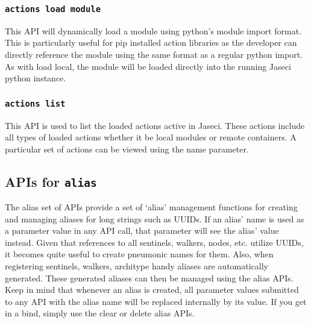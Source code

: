 \subsubsection{\lstinline[basicstyle=\Large\ttfamily]$actions load module$}

{This API will dynamically load a module using python's module import format.
This is particularly useful for pip installed action libraries as the developer
can directly reference the module using the same format as a regular python
import. As with load local, the module will be loaded directly into the running
Jaseci python instance.\vspace{4mm}\par
{}}
\subsubsection{\lstinline[basicstyle=\Large\ttfamily]$actions list$}

{This API is used to list the loaded actions active in Jaseci. These actions
include all types of loaded actions whether it be local modules or remote
containers. A particular set of actions can be viewed using the name parameter.\vspace{4mm}\par
{}}
\subsection{APIs for \lstinline[basicstyle=\Large\ttfamily]$alias$}

\par
The alias set of APIs provide a set of `alias' management functions for
creating and managing aliases for long strings such as UUIDs. If an alias'
name is used as a parameter value in any API call, that parameter will see
the alias' value instead. Given that references to all sentinels, walkers,
nodes, etc. utilize UUIDs, it becomes quite useful to create pneumonic
names for them. Also, when registering   sentinels, walkers, architype
handy aliases are automatically generated. These generated aliases can
then be managed using the alias APIs. Keep in mind that whenever an alias
is created, all parameter values submitted to any API with the alias name
will be replaced internally by its value. If you get in a bind, simply use
the clear or delete alias APIs.

